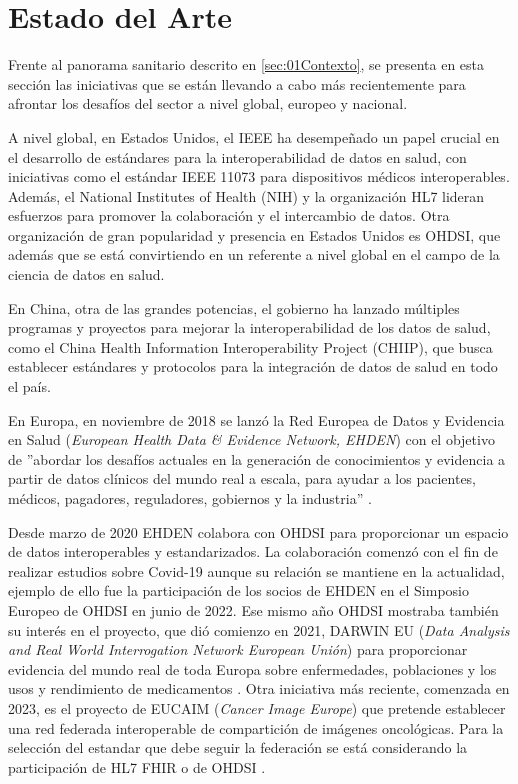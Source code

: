 \section{Estado del Arte} \label{sec:01EstadoArte} 

Frente al panorama sanitario descrito en \ref{sec:01Contexto}, se presenta en esta sección las iniciativas que se están llevando a cabo más recientemente para afrontar los desafíos del sector a nivel global, europeo y nacional.

A nivel global, en Estados Unidos, el IEEE ha desempeñado un papel crucial en el desarrollo de estándares para la interoperabilidad de datos en salud, con iniciativas como el estándar IEEE 11073 para dispositivos médicos interoperables. Además, el National Institutes of Health (NIH) y la organización HL7 lideran esfuerzos para promover la colaboración y el intercambio de datos. Otra organización de gran popularidad y presencia en Estados Unidos es OHDSI, que además que se está convirtiendo en un referente a nivel global en el campo de la ciencia de datos en salud.

En China, otra de las grandes potencias, el gobierno ha lanzado múltiples programas y proyectos para mejorar la interoperabilidad de los datos de salud, como el China Health Information Interoperability Project (CHIIP), que busca establecer estándares y protocolos para la integración de datos de salud en todo el país.



En Europa, en noviembre de 2018 se lanzó la Red Europea de Datos y Evidencia en Salud (\textit{European Health Data \& Evidence Network, EHDEN}) con el objetivo de ''abordar los desafíos actuales en la generación de conocimientos y evidencia a partir de datos clínicos del mundo real a escala, para ayudar a los pacientes, médicos, pagadores, reguladores, gobiernos y la industria'' \cite{ehden}.

Desde marzo de 2020 EHDEN colabora con OHDSI para proporcionar un espacio de datos interoperables y estandarizados. La colaboración comenzó con el fin de realizar estudios sobre Covid-19 aunque su relación se mantiene en la actualidad, ejemplo de ello fue la participación de los socios de EHDEN en el Simposio Europeo de OHDSI en junio de 2022. Ese mismo año OHDSI mostraba también su interés en el proyecto, que dió comienzo en 2021, DARWIN EU (\textit{Data Analysis and Real World Interrogation Network European Unión}) \cite{OHDSI2023Darwin} para proporcionar evidencia del mundo real de toda Europa sobre enfermedades, poblaciones y los usos y rendimiento de medicamentos \cite{Darwin2023website}. Otra iniciativa más reciente, comenzada en 2023, es el proyecto de EUCAIM (\textit{Cancer Image Europe}) que pretende establecer una red federada interoperable de compartición de imágenes oncológicas. Para la selección del estandar que debe seguir la federación se está considerando la participación de HL7 FHIR o de OHDSI \cite{Kalokyri2023Early}.


